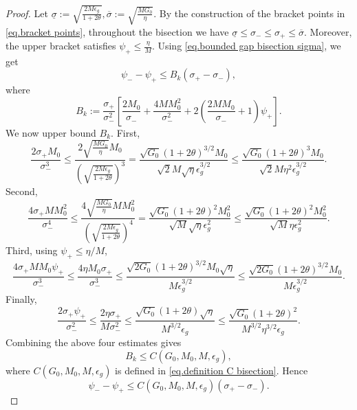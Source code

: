 \documentclass[10pt,a4paper]{amsart}
\begin{document}
\begin{proof}
    Let
    \(
    \underline{\sigma}
    :=
    \sqrt{\frac{2M\epsilon_g}{1+2\theta}},
    \overline{\sigma}
    :=
    \sqrt{\frac{MG_0}{\eta}}.
    \)
    By the construction of the bracket points in \eqref{eq.bracket points},
    throughout the bisection we have
    \(
    \underline{\sigma}
    \le
    \sigma_-
    \le
    \sigma_+
    \le
    \overline{\sigma}.
    \)
    Moreover, the upper bracket satisfies
    \(
    \psi_+\le \frac{\eta}{M}.
    \)
    Using \eqref{eq.bounded gap bisection sigma}, we get
    \[
        \psi_- - \psi_+
        \le
        B_k(\sigma_+-\sigma_-),
    \]
    where
    \[
        B_k
        :=
        \frac{\sigma_+}{\sigma_-^2}
        \left[
            \frac{2M_0}{\sigma_-}
            +
            \frac{4MM_0^2}{\sigma_-^2}
            +
            2\left(
            \frac{2MM_0}{\sigma_-}+1
            \right)\psi_+
            \right].
    \]
    We now upper bound \(B_k\). First,
    \[
        \frac{2\sigma_+M_0}{\sigma_-^3}
        \le
        \frac{
            2\sqrt{\frac{MG_0}{\eta}}M_0
        }{
            \left(
            \sqrt{\frac{2M\epsilon_g}{1+2\theta}}
            \right)^3
        }  =
        \frac{
            \sqrt{G_0}(1+2\theta)^{3/2}M_0
        }{
            \sqrt{2}M\sqrt{\eta}\epsilon_g^{3/2}
        } \le
        \frac{
            \sqrt{G_0}(1+2\theta)^3M_0
        }{
            \sqrt{2}M\eta^2\epsilon_g^{3/2}
        }.
    \]
    Second,
    \[
        \frac{4\sigma_+MM_0^2}{\sigma_-^4}
        \le
        \frac{
            4\sqrt{\frac{MG_0}{\eta}}MM_0^2
        }{
            \left(
            \sqrt{\frac{2M\epsilon_g}{1+2\theta}}
            \right)^4
        } =
        \frac{
            \sqrt{G_0}(1+2\theta)^2M_0^2
        }{
            \sqrt{M}\sqrt{\eta}\epsilon_g^2
        } \le
        \frac{
            \sqrt{G_0}(1+2\theta)^2M_0^2
        }{
            \sqrt{M}\eta\epsilon_g^2
        }.
    \]
    Third, using \(\psi_+\le \eta/M\),
    \[
        \frac{4\sigma_+MM_0\psi_+}{\sigma_-^3}
        \le
        \frac{4\eta M_0\sigma_+}{\sigma_-^3} \le
        \frac{
            \sqrt{2G_0}(1+2\theta)^{3/2}M_0\sqrt{\eta}
        }{
            M\epsilon_g^{3/2}
        } \le
        \frac{
            \sqrt{2G_0}(1+2\theta)^{3/2}M_0
        }{
            M\epsilon_g^{3/2}
        }.
    \]
    Finally,
    \[
        \frac{2\sigma_+\psi_+}{\sigma_-^2}
        \le
        \frac{2\eta\sigma_+}{M\sigma_-^2} \le
        \frac{
            \sqrt{G_0}(1+2\theta)\sqrt{\eta}
        }{
            M^{3/2}\epsilon_g
        } \le
        \frac{
            \sqrt{G_0}(1+2\theta)^2
        }{
            M^{3/2}\eta^{3/2}\epsilon_g
        }.
    \]
    Combining the above four estimates gives
    \[
        B_k
        \le
        C(G_0,M_0,M,\epsilon_g),
    \]
    where \(C(G_0,M_0,M,\epsilon_g)\) is defined in
    \eqref{eq.definition C bisection}. Hence
    \[
        \psi_- - \psi_+
        \le
        C(G_0,M_0,M,\epsilon_g)(\sigma_+-\sigma_-).
    \]


\end{proof}
\end{document}
